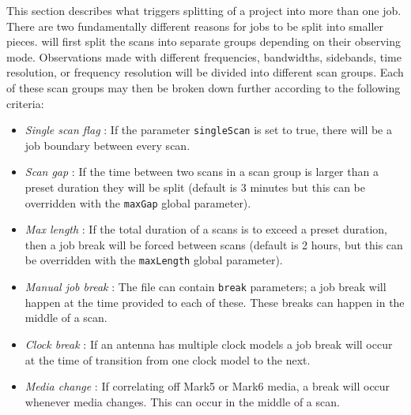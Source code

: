 \documentclass[12pt]{article}
\begin{document}
This section describes what triggers splitting of a project into more than one job.
There are two fundamentally different reasons for jobs to be split into smaller pieces.
\vexdifx will first split the scans into separate groups depending on their observing mode.
Observations made with different frequencies, bandwidths, sidebands, time resolution, or frequency resolution will be divided into different scan groups.
Each of these scan groups may then be broken down further according to the following criteria:
\begin{itemize}
\item {\em Single scan flag} : If the parameter {\tt singleScan} is set to true, there will be a job boundary between every scan.
\item {\em Scan gap} : If the time between two scans in a scan group is larger than a preset duration they will be split (default is 3 minutes but this can be overridden with the {\tt maxGap} global parameter).
\item {\em Max length} : If the total duration of a scans is to exceed a preset duration, then a job break will be forced between scans (default is 2 hours, but this can be overridden with the {\tt maxLength} global parameter).
\item {\em Manual job break} : The \vd file can contain {\tt break} parameters; a job break will happen at the time provided to each of these.  These breaks can happen in the middle of a scan.
\item {\em Clock break} : If an antenna has multiple clock models a job break will occur at the time of transition from one clock model to the next.
\item {\em Media change} : If correlating off Mark5 or Mark6 media, a break will occur whenever media changes.  This can occur in the middle of a scan.
\end{itemize}
\end{document}
